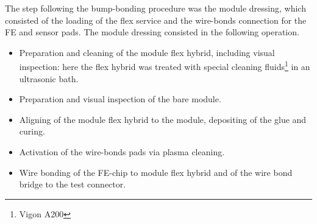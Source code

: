 The step following the bump-bonding procedure was the module dressing, which consisted  of the loading of the flex service and the wire-bonds connection for the FE and sensor pads. The module dressing consisted  in the following operation.
\begin{itemize}
\item Preparation and cleaning of the module flex hybrid, including visual inspection: here the flex hybrid was treated with special cleaning fluids\footnote{Vigon A200} in an ultrasonic bath. %
\item Preparation and visual inspection of the bare module.
\item Aligning of the module flex hybrid to the module, depositing of the glue and curing.
\item Activation of the wire-bonds pads via plasma cleaning.
\item Wire bonding of the FE-chip to module flex hybrid and of the wire bond bridge to the test connector.
\end{itemize}



